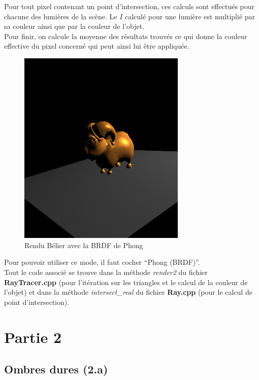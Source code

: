 \documentclass[a4paper,11pt,titlepage]{article}
\begin{document}
Pour tout pixel contenant un point d'intersection, ces calculs sont effectués pour chacune des lumières de la scène. Le $I$ calculé pour une lumière est multiplié par sa couleur ainsi que par la couleur de l'objet.\\
Pour finir, on calcule la moyenne des résultats trouvés ce qui donne la couleur effective du pixel concerné qui peut ainsi lui être appliquée.\\

\begin{figure}[H]
 \begin{center}
 \includegraphics[bb=0 0 50 50,width=8cm]{Rendu/BRDF.png}
 \end{center}

 \caption{Rendu Bélier avec la BRDF de Phong}
 \label{rendu2}
\end{figure}

Pour pouvoir utiliser ce mode, il faut cocher ``Phong (BRDF)''.\\

Tout le code associé se trouve dans la méthode \textit{render2} du fichier \textbf{RayTracer.cpp} (pour l'itération sur les triangles et le calcul de la couleur de l'objet) et dans la méthode \textit{intersect\_real} du fichier \textbf{Ray.cpp} (pour le calcul de point d'intersection).

\newpage
\section{Partie 2}

\subsection{Ombres dures (2.a)}
\end{document}
